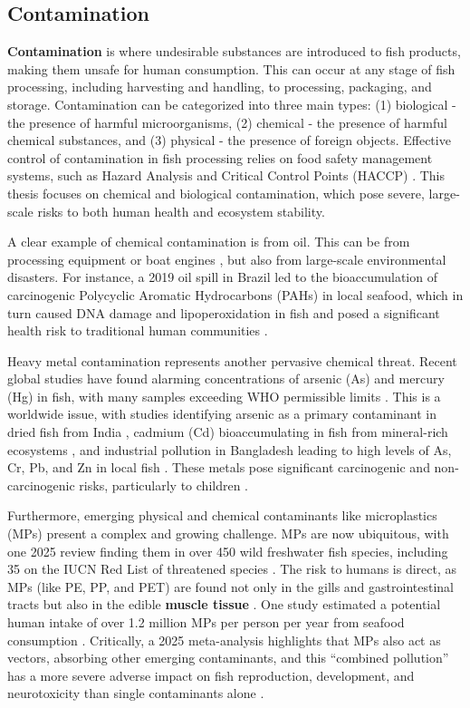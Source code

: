 \subsection{Contamination}

\textbf{Contamination} is where undesirable substances are introduced to fish products, making them unsafe for human consumption. This can occur at any stage of fish processing, including harvesting and handling, to processing, packaging, and storage. Contamination can be categorized into three main types: (1) biological - the presence of harmful microorganisms, (2) chemical - the presence of harmful chemical substances, and (3) physical - the presence of foreign objects. Effective control of contamination in fish processing relies on food safety management systems, such as Hazard Analysis and Critical Control Points (HACCP) \citep{Bremner2002}.
This thesis focuses on chemical and biological contamination, which pose severe, large-scale risks to both human health and ecosystem stability.

A clear example of chemical contamination is from oil. This can be from processing equipment or boat engines \citep{Moens2003}, but also from large-scale environmental disasters. For instance, a 2019 oil spill in Brazil led to the bioaccumulation of carcinogenic Polycyclic Aromatic Hydrocarbons (PAHs) in local seafood, which in turn caused DNA damage and lipoperoxidation in fish and posed a significant health risk to traditional human communities \citep{Mello2025}.

Heavy metal contamination represents another pervasive chemical threat. Recent global studies have found alarming concentrations of arsenic (As) and mercury (Hg) in fish, with many samples exceeding WHO permissible limits \citep{Cobbinah2025}. This is a worldwide issue, with studies identifying arsenic as a primary contaminant in dried fish from India \citep{Sonone2025}, cadmium (Cd) bioaccumulating in fish from mineral-rich ecosystems \citep{Kumari2025}, and industrial pollution in Bangladesh leading to high levels of As, Cr, Pb, and Zn in local fish \citep{Choudhury2025}. These metals pose significant carcinogenic and non-carcinogenic risks, particularly to children \citep{Cobbinah2025, Sonone2025, Onoja2025}.

Furthermore, emerging physical and chemical contaminants like microplastics (MPs) present a complex and growing challenge. MPs are now ubiquitous, with one 2025 review finding them in over 450 wild freshwater fish species, including 35 on the IUCN Red List of threatened species \citep{De2025}. The risk to humans is direct, as MPs (like PE, PP, and PET) are found not only in the gills and gastrointestinal tracts but also in the edible \textbf{muscle tissue} \citep{Pingki2025, Jamal2025, Shakik2025}. One study estimated a potential human intake of over 1.2 million MPs per person per year from seafood consumption \citep{Jamal2025}. Critically, a 2025 meta-analysis highlights that MPs also act as vectors, absorbing other emerging contaminants, and this ``combined pollution'' has a more severe adverse impact on fish reproduction, development, and neurotoxicity than single contaminants alone \citep{Wu2025}.

